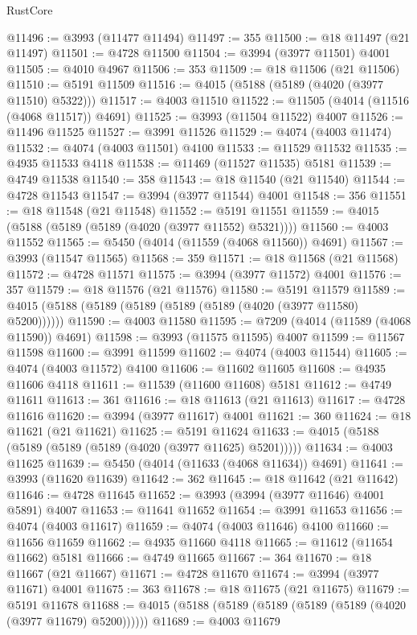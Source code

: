 \begin{lexlean}{RustCore}
\begin{coremodule}
@11496 := @3993 (@11477 @11494)
@11497 := 355
@11500 := @18 @11497 (@21 @11497)
@11501 := @4728 @11500
@11504 := @3994 (@3977 @11501) @4001
@11505 := @4010 @4967
@11506 := 353
@11509 := @18 @11506 (@21 @11506)
@11510 := @5191 @11509
@11516 := @4015 (@5188 (@5189 (@4020 (@3977 @11510) @5322)))
@11517 := @4003 @11510
@11522 := @11505 (@4014 (@11516 (@4068 @11517)) @4691)
@11525 := @3993 (@11504 @11522) @4007
@11526 := @11496 @11525
@11527 := @3991 @11526
@11529 := @4074 (@4003 @11474)
@11532 := @4074 (@4003 @11501) @4100
@11533 := @11529 @11532
@11535 := @4935 @11533 @4118
@11538 := @11469 (@11527 @11535) @5181
@11539 := @4749 @11538
@11540 := 358
@11543 := @18 @11540 (@21 @11540)
@11544 := @4728 @11543
@11547 := @3994 (@3977 @11544) @4001
@11548 := 356
@11551 := @18 @11548 (@21 @11548)
@11552 := @5191 @11551
@11559 := @4015 (@5188 (@5189 (@5189 (@4020 (@3977 @11552) @5321))))
@11560 := @4003 @11552
@11565 := @5450 (@4014 (@11559 (@4068 @11560)) @4691)
@11567 := @3993 (@11547 @11565)
@11568 := 359
@11571 := @18 @11568 (@21 @11568)
@11572 := @4728 @11571
@11575 := @3994 (@3977 @11572) @4001
@11576 := 357
@11579 := @18 @11576 (@21 @11576)
@11580 := @5191 @11579
@11589 := @4015 (@5188 (@5189 (@5189 (@5189 (@5189 (@4020 (@3977 @11580) @5200))))))
@11590 := @4003 @11580
@11595 := @7209 (@4014 (@11589 (@4068 @11590)) @4691)
@11598 := @3993 (@11575 @11595) @4007
@11599 := @11567 @11598
@11600 := @3991 @11599
@11602 := @4074 (@4003 @11544)
@11605 := @4074 (@4003 @11572) @4100
@11606 := @11602 @11605
@11608 := @4935 @11606 @4118
@11611 := @11539 (@11600 @11608) @5181
@11612 := @4749 @11611
@11613 := 361
@11616 := @18 @11613 (@21 @11613)
@11617 := @4728 @11616
@11620 := @3994 (@3977 @11617) @4001
@11621 := 360
@11624 := @18 @11621 (@21 @11621)
@11625 := @5191 @11624
@11633 := @4015 (@5188 (@5189 (@5189 (@5189 (@4020 (@3977 @11625) @5201)))))
@11634 := @4003 @11625
@11639 := @5450 (@4014 (@11633 (@4068 @11634)) @4691)
@11641 := @3993 (@11620 @11639)
@11642 := 362
@11645 := @18 @11642 (@21 @11642)
@11646 := @4728 @11645
@11652 := @3993 (@3994 (@3977 @11646) @4001 @5891) @4007
@11653 := @11641 @11652
@11654 := @3991 @11653
@11656 := @4074 (@4003 @11617)
@11659 := @4074 (@4003 @11646) @4100
@11660 := @11656 @11659
@11662 := @4935 @11660 @4118
@11665 := @11612 (@11654 @11662) @5181
@11666 := @4749 @11665
@11667 := 364
@11670 := @18 @11667 (@21 @11667)
@11671 := @4728 @11670
@11674 := @3994 (@3977 @11671) @4001
@11675 := 363
@11678 := @18 @11675 (@21 @11675)
@11679 := @5191 @11678
@11688 := @4015 (@5188 (@5189 (@5189 (@5189 (@5189 (@4020 (@3977 @11679) @5200))))))
@11689 := @4003 @11679

\end{coremodule}
\end{lexlean}
